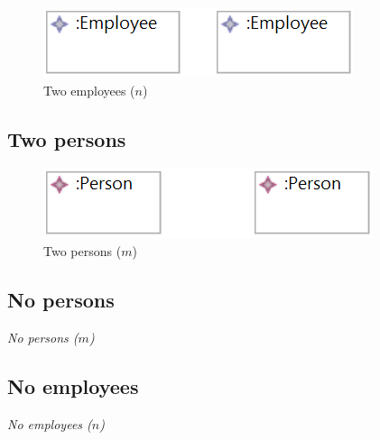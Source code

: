 \documentclass{article}
\begin{document}
\begin{figure}[ht]
    \centering
    \includegraphics[scale=0.45]{graphics/bij-two-employees.png}
    \caption{Two employees ($n$)}
    \label{fig:I2}
\end{figure}

\subsection{Two persons}
\label{sec:two-persons}

\begin{figure}[ht]
    \centering
    \includegraphics[scale=0.45]{graphics/bij-two-persons.png}
    \caption{Two persons ($m$)}
    \label{fig:I3}
\end{figure}

\subsection{No persons}
\label{sec:no-persons}

\begin{center}
\textit{No persons ($m$)}
\end{center}

\subsection{No employees}
\label{sec:no-employees}

\begin{center}
\textit{No employees ($n$)}
\end{center}

\pagebreak
\end{document}
